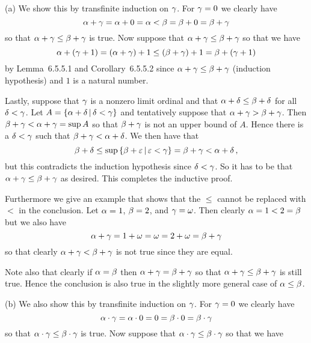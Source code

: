 
\begin{solution}
	(a) We show this by transfinite induction on $\gamma$.
    For $\gamma = 0$ we clearly have
    $$
    \alpha + \gamma = \alpha + 0 = \alpha < \beta = \beta + 0 = \beta + \gamma
    $$
    so that $\alpha + \gamma \leq \beta + \gamma$ is true.
    Now suppose that $\alpha + \gamma \leq \beta + \gamma$ so that we have
    $$
    \alpha + (\gamma + 1) = (\alpha + \gamma) + 1 \leq (\beta + \gamma) + 1 = \beta + (\gamma + 1)
    $$
    by Lemma~6.5.5.1 and Corollary~6.5.5.2 since $\alpha + \gamma \leq \beta + \gamma$ (induction hypothesis) and $1$ is a natural number.

    Lastly, suppose that $\gamma$ is a nonzero limit ordinal and that $\alpha + \delta \leq \beta + \delta$ for all $\delta < \gamma$.
    Let $A = \left\{ \alpha + \delta \,|\, \delta < \gamma \right\}$ and tentatively suppose that $\alpha + \gamma > \beta + \gamma$.
    Then $\beta + \gamma < \alpha + \gamma = \sup{A}$ so that $\beta + \gamma$ is not an upper bound of $A$.
    Hence there is a $\delta < \gamma$ such that $\beta + \gamma < \alpha + \delta$.
    We then have that
    $$
    \beta + \delta \leq \sup\left\{ \beta + \varepsilon \,|\, \varepsilon < \gamma \right\} = \beta + \gamma < \alpha + \delta \,,
    $$
    but this contradicts the induction hypothesis since $\delta < \gamma$.
    So it has to be that $\alpha + \gamma \leq \beta + \gamma$ as desired.
    This completes the inductive proof.

    Furthermore we give an example that shows that the $\leq$ cannot be replaced with $<$ in the conclusion.
    Let $\alpha = 1$, $\beta = 2$, and $\gamma = \omega$.
    Then clearly $\alpha = 1 < 2 = \beta$ but we also have
    $$
    \alpha + \gamma = 1 + \omega = \omega = 2 + \omega = \beta + \gamma
    $$
    so that clearly $\alpha + \gamma < \beta + \gamma$ is not true since they are equal.

    Note also that clearly if $\alpha = \beta$ then $\alpha + \gamma = \beta + \gamma$ so that $\alpha + \gamma \leq \beta + \gamma$ is still true.
    Hence the conclusion is also true in the slightly more general case of $\alpha \leq \beta$. \qedsymbol

    (b) We also show this by transfinite induction on $\gamma$.
    For $\gamma = 0$ we clearly have
    $$
    \alpha \cdot \gamma = \alpha \cdot 0 = 0 = \beta \cdot 0 = \beta \cdot \gamma
    $$
    so that $\alpha \cdot \gamma \leq \beta \cdot \gamma$ is true.
    Now suppose that $\alpha \cdot \gamma \leq \beta \cdot \gamma$ so that we have


\end{solution}
